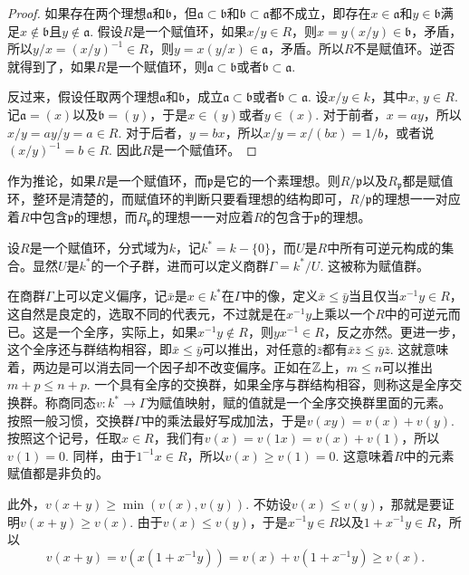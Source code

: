 \begin{proof}
	如果存在两个理想$\mathfrak{a}$和$\mathfrak{b}$，但$\mathfrak{a}\subset \mathfrak{b}$和$\mathfrak{b}\subset \mathfrak{a}$都不成立，即存在$x\in \mathfrak{a}$和$y\in \mathfrak{b}$满足$x\not\in \mathfrak{b}$且$y\not\in \mathfrak{a}$. 假设$R$是一个赋值环，如果$x/y\in R$，则$x=y(x/y)\in \mathfrak{b}$，矛盾，所以$y/x=(x/y)^{-1}\in R$，则$y=x(y/x)\in\mathfrak{a}$，矛盾。所以$R$不是赋值环。逆否就得到了，如果$R$是一个赋值环，则$\mathfrak{a}\subset \mathfrak{b}$或者$\mathfrak{b}\subset \mathfrak{a}$.

	反过来，假设任取两个理想$\mathfrak{a}$和$\mathfrak{b}$，成立$\mathfrak{a}\subset \mathfrak{b}$或者$\mathfrak{b}\subset \mathfrak{a}$. 设$x/y\in k$，其中$x$, $y\in R$. 记$\mathfrak{a}=(x)$以及$\mathfrak{b}=(y)$，于是$x\in (y)$或者$y\in (x)$. 对于前者，$x=ay$，所以$x/y=ay/y=a\in R$. 对于后者，$y=bx$，所以$x/y=x/(bx)=1/b$，或者说$(x/y)^{-1}=b\in R$. 因此$R$是一个赋值环。
\end{proof}

作为推论，如果$R$是一个赋值环，而$\mathfrak{p}$是它的一个素理想。则$R/\mathfrak{p}$以及$R_{\mathfrak{p}}$都是赋值环，整环是清楚的，而赋值环的判断只要看理想的结构即可，$R/\mathfrak{p}$的理想一一对应着$R$中包含$\mathfrak{p}$的理想，而$R_{\mathfrak{p}}$的理想一一对应着$R$的包含于$\mathfrak{p}$的理想。

\para[赋值群] 设$R$是一个赋值环，分式域为$k$，记$k^*=k-\{0\}$，而$U$是$R$中所有可逆元构成的集合。显然$U$是$k^*$的一个子群，进而可以定义商群$\Gamma=k^*/U$. 这被称为赋值群。

在商群$\Gamma$上可以定义偏序，记$\bar{x}$是$x\in k^*$在$\Gamma$中的像，定义$\bar{x}\leq \bar{y}$当且仅当$x^{-1}y\in R$，这自然是良定的，选取不同的代表元，不过就是在$x^{-1}y$上乘以一个$R$中的可逆元而已。这是一个全序，实际上，如果$x^{-1}y\not\in R$，则$yx^{-1}\in R$，反之亦然。更进一步，这个全序还与群结构相容，即$\bar{x}\leq \bar{y}$可以推出，对任意的$\bar{z}$都有$\bar{x}\bar{z}\leq \bar{y}\bar{z}$. 这就意味着，两边是可以消去同一个因子却不改变偏序。正如在$\mathbb{Z}$上，$m\leq n$可以推出$m+p\leq n+p$. 一个具有全序的交换群，如果全序与群结构相容，则称这是全序交换群。称商同态$v:k^*\to\Gamma$为赋值映射，赋的值就是一个全序交换群里面的元素。按照一般习惯，交换群$\Gamma$中的乘法最好写成加法，于是$v(xy)=v(x)+v(y)$. 按照这个记号，任取$x\in R$，我们有$v(x)=v(1x)=v(x)+v(1)$，所以$v(1)=0$. 同样，由于$1^{-1}x\in R$，所以$v(x)\geq v(1)=0$. 这意味着$R$中的元素赋值都是非负的。

此外，$v(x+y)\geq \min\left(v(x),v(y)\right)$. 不妨设$v(x)\leq v(y)$，那就是要证明$v(x+y)\geq v(x)$. 由于$v(x)\leq v(y)$，于是$x^{-1}y\in R$以及$1+x^{-1}y\in R$，所以
\[
	v(x+y)=v(x(1+x^{-1}y))=v(x)+v(1+x^{-1}y)\geq v(x).
\]

